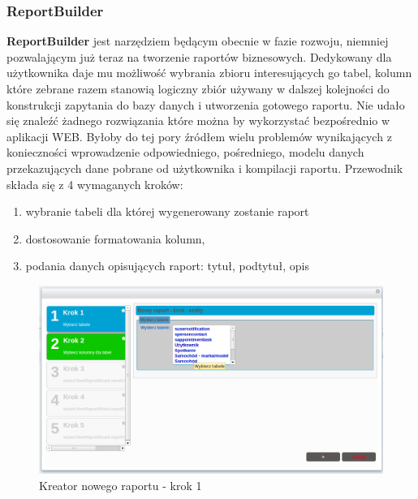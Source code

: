 	\subsubsection{ReportBuilder}
		\textbf{ReportBuilder} jest narzędziem będącym obecnie w fazie rozwoju, niemniej pozwalającym już teraz na tworzenie
		raportów biznesowych. Dedykowany dla użytkownika daje mu możliwość wybrania zbioru interesujących go tabel, kolumn które
		zebrane razem stanowią logiczny zbiór używany w dalszej kolejności do konstrukcji zapytania do bazy danych i utworzenia
		gotowego raportu. 
		Nie udało się znaleźć żadnego rozwiązania które można by wykorzystać bezpośrednio w aplikacji WEB. Byłoby do tej pory
		źródłem wielu problemów wynikających z konieczności wprowadzenie odpowiedniego, pośredniego, modelu danych przekazujących
		dane pobrane od użytkownika i kompilacji raportu. 
		Przewodnik składa się z 4 wymaganych kroków:
		\begin{enumerate}
			\item wybranie tabeli dla której wygenerowany zostanie raport
			\item dostosowanie formatowania kolumn,
			\item podania danych opisujących raport: tytuł, podtytuł, opis
		\end{enumerate}		
		\begin{figure}[H]
			\centering
			\includegraphics[width=1.0\textwidth]{images/rbuilder_step1}
			\caption[Kreator nowego raportu - krok 1]{
				Kreator nowego raportu - krok 1
			}
			\label{app:wizard_newReport_step1}
		\end{figure}	
